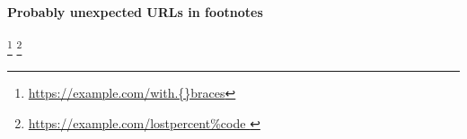 \documentclass{article}
\begin{document}
\paragraph{Probably unexpected URLs in footnotes}
\footnote{\url{https://example.com/with.{}braces}}
\footnote{\url{https://example.com/lostpercent%
}}
\end{document}
